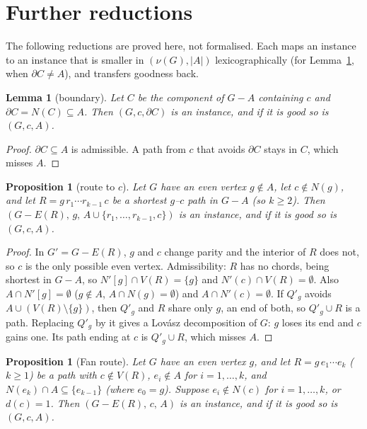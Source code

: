 \documentclass[11pt]{amsart}
\newtheorem{lemma}[theorem]{Lemma}
\newtheorem{proposition}[theorem]{Proposition}
\theoremstyle{definition}
\begin{document}
\section{Further reductions}\label{sec:more}

The following reductions are proved here, not formalised. Each maps an instance to an instance that
is smaller in $(\nu(G),|A|)$ lexicographically (for Lemma~\ref{lem:boundary}, when
$\partial C\neq A$), and transfers goodness back.

\begin{lemma}[boundary]\label{lem:boundary}
Let $C$ be the component of $G-A$ containing $c$ and $\partial C=N(C)\subseteq A$. Then
$(G,c,\partial C)$ is an instance, and if it is good so is $(G,c,A)$.
\end{lemma}

\begin{proof}
$\partial C\subseteq A$ is admissible. A path from $c$ that avoids $\partial C$ stays in $C$, which
misses $A$.
\end{proof}

\begin{proposition}[route to $c$]\label{prop:route}
Let $G$ have an even vertex $g\notin A$, let $c\notin N(g)$, and let $R=g\,r_1\cdots r_{k-1}\,c$ be a
shortest $g$--$c$ path in $G-A$ (so $k\ge2$).
Then $(G-E(R),\,g,\,A\cup\{r_1,\dots,r_{k-1},c\})$ is an instance, and if it is good so is
$(G,c,A)$.
\end{proposition}

\begin{proof}
In $G'=G-E(R)$, $g$ and $c$ change parity and the interior of $R$ does not, so $c$ is the only
possible even vertex. Admissibility: $R$ has no chords, being shortest in $G-A$, so
$N'[g]\cap V(R)=\{g\}$ and $N'(c)\cap V(R)=\emptyset$. Also $A\cap N'[g]=\emptyset$ ($g\notin A$,
$A\cap N(g)=\emptyset$) and $A\cap N'(c)=\emptyset$. If $Q'_g$ avoids $A\cup(V(R)\setminus\{g\})$, then
$Q'_g$ and $R$ share only $g$, an end of both, so $Q'_g\cup R$ is a path. Replacing $Q'_g$ by it gives a Lov\'asz decomposition of $G$: $g$ loses its
end and $c$ gains one. Its path ending at $c$ is $Q'_g\cup R$, which misses $A$.
\end{proof}

\begin{proposition}[Fan route]\label{prop:fanroute}
Let $G$ have an even vertex $g$, and let $R=g\,e_1\cdots e_k$ ($k\ge1$) be a path with $c\notin V(R)$,
$e_i\notin A$ for $i=1,\dots,k$, and $N(e_k)\cap A\subseteq\{e_{k-1}\}$ (where $e_0=g$). Suppose
$e_i\notin N(c)$ for $i=1,\dots,k$, or $d(c)=1$.
Then $(G-E(R),\,c,\,A)$ is an instance, and if it is good so is $(G,c,A)$.
\end{proposition}
\end{document}
